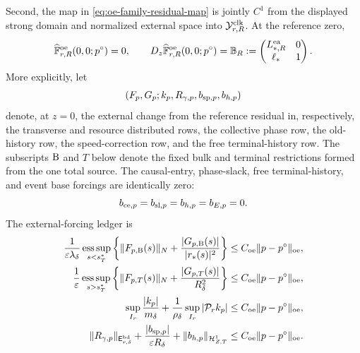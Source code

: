 \begin{theorem}
Second, the map in \cref{eq:oe-family-residual-map} is jointly \(C^1\)
from the displayed strong domain and normalized external space into
\(\mathcal Y_{r,R}^{\rm clk}\).  At the reference zero,
\begin{equation}
 \widehat{\mathbb F}_{r,R}^{\rm oe}(0,0;p^\circ)=0,
 \qquad
 D_z\widehat{\mathbb F}_{r,R}^{\rm oe}(0,0;p^\circ)
 =\mathbb B_R
 :=\begin{pmatrix}L_{*,R}^{\rm ea}&0\\ \ell_*&1\end{pmatrix}.
                                                        \label{eq:oe-family-reference-linearization}
\end{equation}
More explicitly, let
\begin{equation}
 (F_p,G_p;k_p,R_{\gamma,p},b_{{\rm sp},p},b_{h,p})
                                                        \label{eq:oe-family-forcing-components}
\end{equation}
denote, at \(z=0\), the external change from the reference residual in,
respectively, the transverse and resource distributed rows, the collective
phase row, the old-history row, the speed-correction row, and the free
terminal-history row.  The subscripts \({\rm B}\) and \(T\) below denote
the fixed bulk and terminal restrictions formed from the one total source.
The causal-entry, phase-slack, free terminal-history, and event base
forcings are identically zero:
\begin{equation}
 b_{{\rm ce},p}=b_{{\rm sl},p}=b_{h,p}=b_{E,p}=0.           \label{eq:oe-family-zero-base-rows}
\end{equation}
The external-forcing ledger is
\begin{align}
 \frac1{\varepsilon\lambda_\delta}
 \operatorname*{ess\,sup}_{s<s_T^*}
 \left\{\|F_{p,{\rm B}}(s)\|_N
       +\frac{|G_{p,{\rm B}}(s)|}{|r_*(s)|^2}\right\}
 &\le C_{\rm oe}\|p-p^\circ\|_{\rm oe},\notag\\
 \frac1\varepsilon
 \operatorname*{ess\,sup}_{s>s_T^*}
 \left\{\|F_{p,T}(s)\|_N
       +\frac{|G_{p,T}(s)|}{R_\delta^2}\right\}
 &\le C_{\rm oe}\|p-p^\circ\|_{\rm oe},         \label{eq:oe-family-distributed-forcing-ledger}\\
 \sup_{I_r}\frac{|k_p|}{m_\delta}
 +\frac1{\rho_\delta}\sup_{I_r}|\mathcal P_rk_p|
 &\le C_{\rm oe}\|p-p^\circ\|_{\rm oe},\notag\\
 \|R_{\gamma,p}\|_{\mathsf E_{r,\delta}^{\rm bd}}
 +\frac{|b_{{\rm sp},p}|}{\varepsilon R_\delta}
 +\|b_{h,p}\|_{\mathcal H_{Z,T}^1}
 &\le C_{\rm oe}\|p-p^\circ\|_{\rm oe}.         \label{eq:oe-family-finite-forcing-ledger}

\end{align}
\end{theorem}
